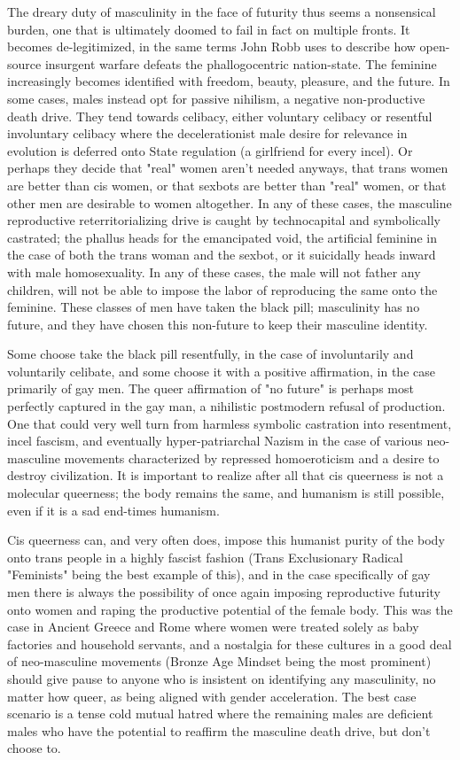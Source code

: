 \documentclass[12pt, a5paper, twoside, openright]{memoir}
\begin{document}
The dreary duty of masculinity in the face of futurity thus seems a nonsensical burden, one that is ultimately doomed to fail in fact on multiple fronts. It becomes de-legitimized, in the same terms John Robb uses to describe how open-source insurgent warfare defeats the phallogocentric nation-state. The feminine increasingly becomes identified with freedom, beauty, pleasure, and the future. In some cases, males instead opt for passive nihilism, a negative non-productive death drive. They tend towards celibacy, either voluntary celibacy or resentful involuntary celibacy where the decelerationist male desire for relevance in evolution is deferred onto State regulation (a girlfriend for every incel). Or perhaps they decide that "real" women aren't needed anyways, that trans women are better than cis women, or that sexbots are better than "real" women, or that other men are desirable to women altogether. In any of these cases, the masculine reproductive reterritorializing drive is caught by technocapital and symbolically castrated; the phallus heads for the emancipated void, the artificial feminine in the case of both the trans woman and the sexbot, or it suicidally heads inward with male homosexuality. In any of these cases, the male will not father any children, will not be able to impose the labor of reproducing the same onto the feminine. These classes of men have taken the black pill; masculinity has no future, and they have chosen this non-future to keep their masculine identity.

Some choose take the black pill resentfully, in the case of involuntarily and voluntarily celibate, and some choose it with a positive affirmation, in the case primarily of gay men. The queer affirmation of "no future" is perhaps most perfectly captured in the gay man, a nihilistic postmodern refusal of production. One that could very well turn from harmless symbolic castration into resentment, incel fascism, and eventually hyper-patriarchal Nazism in the case of various neo-masculine movements characterized by repressed homoeroticism and a desire to destroy civilization. It is important to realize after all that cis queerness is not a molecular queerness; the body remains the same, and humanism is still possible, even if it is a sad end-times humanism.

Cis queerness can, and very often does, impose this humanist purity of the body onto trans people in a highly fascist fashion (Trans Exclusionary Radical "Feminists" being the best example of this), and in the case specifically of gay men there is always the possibility of once again imposing reproductive futurity onto women and raping the productive potential of the female body. This was the case in Ancient Greece and Rome where women were treated solely as baby factories and household servants, and a nostalgia for these cultures in a good deal of neo-masculine movements (Bronze Age Mindset being the most prominent) should give pause to anyone who is insistent on identifying any masculinity, no matter how queer, as being aligned with gender acceleration. The best case scenario is a tense cold mutual hatred where the remaining males are deficient males who have the potential to reaffirm the masculine death drive, but don't choose to.
\end{document}
